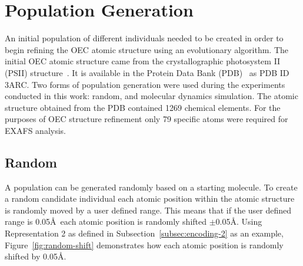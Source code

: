 \section{Population Generation}

An initial population of different individuals needed to be created in order to begin refining the OEC atomic structure using an evolutionary algorithm. The initial OEC atomic structure came from the crystallographic photosystem II (PSII) structure~\cite{umena2011crystal}. It is available in the Protein Data Bank (PDB)~\cite{databank} as PDB ID 3ARC. Two forms of population generation were used during the experiments conducted in this work: random, and molecular dynamics simulation. The atomic structure obtained from the PDB contained 1269 chemical elements. For the purposes of OEC structure refinement only 79 specific atoms were required for EXAFS analysis.


\subsection{Random}

A population can be generated randomly based on a starting molecule. To create a random candidate individual each atomic position within the atomic structure is randomly moved by a user defined range. This means that if the user defined range is 0.05\AA\ each atomic position is randomly shifted $\pm$0.05\AA. Using Representation 2 as defined in Subsection~\ref{subsec:encoding-2} as an example, Figure~\ref{fig:random-shift} demonstrates how each atomic position is randomly shifted by 0.05\AA.

